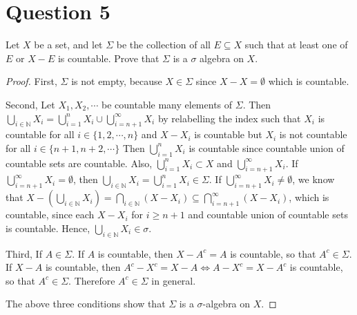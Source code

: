 \section{Question 5}

\begin{question}
    Let $X$ be a set, and let $\Sigma$ be the collection of all $E \subseteq X$ such that at least one of $E$ or $X-E$ is countable. Prove that $\Sigma$ is a $\sigma$ algebra on $X$.
\end{question}

\begin{answer}
    \begin{proof}
        First, $\Sigma$ is not empty, because $X \in \Sigma$ since $X - X = \emptyset$ which is countable.
        
        Second, Let $X_1,X_2,\cdots$ be countable many elements of $\Sigma$. Then $\bigcup_{i \in \mathbb{N}}X_i = \bigcup_{i = 1}^{n}X_i \cup \bigcup_{i = n+1}^{\infty}X_i$ by relabelling the index such that $X_i$ is countable for all $i \in \{1,2,\cdots,n\}$ and $X - X_i$ is countable but $X_i$ is not countable for all $i \in \{n+1,n+2,\cdots\}$ Then $\bigcup_{i = 1}^{n}X_i$ is countable since countable union of countable sets are countable. Also, $\bigcup_{i = 1}^{n}X_i \subset X$ and $\bigcup_{i = n+1}^{\infty}X_i$. If $\bigcup_{i = n+1}^{\infty}X_i = \emptyset$, then $\bigcup_{i \in \mathbb{N}}X_i = \bigcup_{i = 1}^{n}X_i \in \Sigma$. If $\bigcup_{i = n+1}^{\infty}X_i \neq \emptyset$, we know that $X - \left(\bigcup_{i \in \mathbb{N}}X_i\right) = \bigcap_{i \in \mathbb{N}}(X - X_i) \subseteq \bigcap_{i = n+1}^{\infty}(X - X_i)$, which is countable, since each $X - X_i$ for $i \geq n+1$ and countable union of countable sets is countable. Hence, $\bigcup_{i \in \mathbb{N}}X_i \in \sigma$.
        
        Third, If $A \in \Sigma$. If $A$ is countable, then $X - A^c = A$ is countable, so that $A^c \in \Sigma$. If $X - A$ is countable, then $A^c - X^c = X - A \Leftrightarrow A - X^c = X - A^c$ is countable, so that $A^c \in \Sigma$. Therefore $A^c \in \Sigma$ in general.
         
        The above three conditions show that $\Sigma$ is a $\sigma$-algebra on $X$.
    \end{proof}
\end{answer}